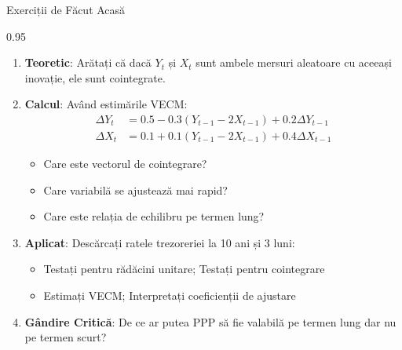 \documentclass[9pt, aspectratio=169, t]{beamer}
\begin{document}
\begin{frame}{Exerciții de Făcut Acasă}
    \begin{cminipage}{0.95\textwidth}
    {\footnotesize
    \begin{enumerate}\setlength{\itemsep}{2pt}
        \item \textbf{Teoretic}: Arătați că dacă $Y_t$ și $X_t$ sunt ambele mersuri aleatoare cu aceeași inovație, ele sunt cointegrate.

        \item \textbf{Calcul}: Având estimările VECM:
            \begin{align*}
                \Delta Y_t &= 0.5 - 0.3(Y_{t-1} - 2X_{t-1}) + 0.2\Delta Y_{t-1} \\
                \Delta X_t &= 0.1 + 0.1(Y_{t-1} - 2X_{t-1}) + 0.4\Delta X_{t-1}
            \end{align*}
            \begin{itemize}\setlength{\itemsep}{0pt}
                \item Care este vectorul de cointegrare?
                \item Care variabilă se ajustează mai rapid?
                \item Care este relația de echilibru pe termen lung?
            \end{itemize}

        \item \textbf{Aplicat}: Descărcați ratele trezoreriei la 10 ani și 3 luni:
            \begin{itemize}\setlength{\itemsep}{0pt}
                \item Testați pentru rădăcini unitare; Testați pentru cointegrare
                \item Estimați VECM; Interpretați coeficienții de ajustare
            \end{itemize}

        \item \textbf{Gândire Critică}: De ce ar putea PPP să fie valabilă pe termen lung dar nu pe termen scurt?
    \end{enumerate}
    }
    \end{cminipage}
\end{frame}
\end{document}
